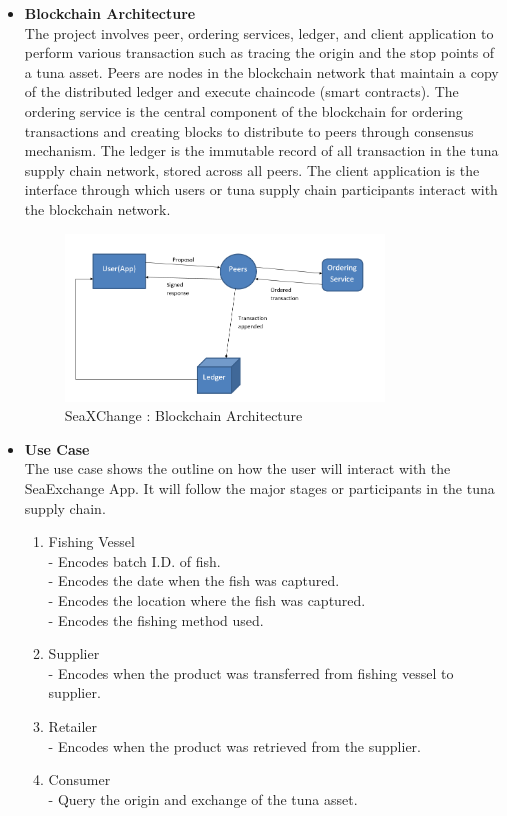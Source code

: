 	\begin{itemize}
		\item \textbf{Blockchain Architecture}
		\\The project involves peer, ordering services, ledger, and client application to perform various transaction such as tracing the origin and the stop points of a tuna asset. Peers are nodes in the blockchain network that maintain a copy of the distributed ledger and execute chaincode (smart contracts). The ordering service is the central component of the blockchain for ordering transactions and creating blocks to distribute to peers through consensus mechanism. The ledger is the immutable record of all transaction in the tuna supply chain network, stored across all peers. The client application is the interface through which users or tuna supply chain participants interact with the blockchain network.
		
		\begin{figure}[H]
			\centering
			\includegraphics[width=0.8\textwidth]{SeaXChange_model.png}
			\caption{SeaXChange : Blockchain Architecture}
			\label{fig:blockchain_model}
		\end{figure}
		
		
		\item \textbf{Use Case}
		\\The use case shows the outline on how the user will interact with the SeaExchange App. It will follow the major stages or participants in the tuna supply chain. 
		\begin{enumerate}
			\item Fishing Vessel
			\\- Encodes batch I.D. of fish.
			\\- Encodes the date when the fish was captured.
			\\- Encodes the location where the fish was captured.
			\\- Encodes the fishing method used.
			
			\item Supplier
			\\- Encodes when the product was transferred from fishing vessel to supplier.
			
			\item Retailer
			\\- Encodes when the product was retrieved from the supplier.
			
			\item Consumer
			\\- Query the origin and exchange of the tuna asset.
		
			
		\end{enumerate}
	\end{itemize}
